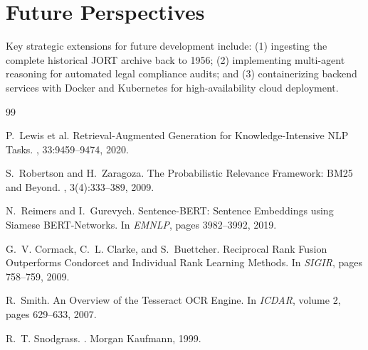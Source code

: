 \documentclass[12pt,a4paper]{report}
\begin{document}
\section{Future Perspectives}
Key strategic extensions for future development include: (1) ingesting the complete historical JORT archive back to 1956; (2) implementing multi-agent reasoning for automated legal compliance audits; and (3) containerizing backend services with Docker and Kubernetes for high-availability cloud deployment.

\begin{thebibliography}{99}
\small

P.~Lewis et al.
\newblock Retrieval-Augmented Generation for Knowledge-Intensive NLP Tasks.
, 33:9459--9474, 2020.

S.~Robertson and H.~Zaragoza.
\newblock The Probabilistic Relevance Framework: BM25 and Beyond.
, 3(4):333--389, 2009.

N.~Reimers and I.~Gurevych.
\newblock Sentence-BERT: Sentence Embeddings using Siamese BERT-Networks.
\newblock In {\em EMNLP}, pages 3982--3992, 2019.

G.~V. Cormack, C.~L. Clarke, and S.~Buettcher.
\newblock Reciprocal Rank Fusion Outperforms Condorcet and Individual Rank Learning Methods.
\newblock In {\em SIGIR}, pages 758--759, 2009.

R.~Smith.
\newblock An Overview of the Tesseract OCR Engine.
\newblock In {\em ICDAR}, volume 2, pages 629--633, 2007.

R.~T. Snodgrass.
.
\newblock Morgan Kaufmann, 1999.

\end{thebibliography}
\end{document}
